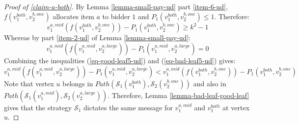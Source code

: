 \begin{proof}[Proof of \cref{claim-a-both}]
            By Lemma \ref{lemma-small-pay-ud} part \ref{item-6-ud}, $f(v_1^{both},v_2^{b,one})$ allocates item $a$ to bidder $1$ and $P_1(v_1^{both},\allowbreak v_2^{b,one})\le 1$. Therefore:
\begin{equation}\label{eq-good-leaf5-ud}
 v_1^{a,mid}(f(v_1^{both},v_2^{b,one}))-P_1(v_1^{both},v_2^{b,one})\ge k^2-1   
\end{equation}
Whereas by part \ref{item-2-ud} of Lemma \ref{lemma-small-pay-ud}: 
 \begin{equation}\label{eq-bad-leaf5-ud}
 v_1^{a,mid}(f(v_1^{a,mid},v_2^{a,large}))-P_1(v_1^{a,mid},v_2^{a,large})=0   
\end{equation}
Combining the inequalities (\ref{eq-good-leaf5-ud}) and (\ref{eq-bad-leaf5-ud}) gives:
\begin{equation*}
 v_1^{a,mid}(f(v_1^{a,mid},v_2^{a,large}))-P_1(v_1^{a,mid},v_2^{a,large})< 
 v_1^{a,mid}(f(v_1^{both},v_2^{b,one}))-P_1(v_1^{both},v_2^{b,one})
\end{equation*}
Note that vertex $u$ belongs in $Path(\mathcal S_1(v_1^{both}),\mathcal S_2(v_2^{b,one}))$ and also in
$Path(\mathcal{S}_1(v_1^{a,mid}),\allowbreak\mathcal{S}_2(v_2^{a,large}))$. Therefore, Lemma \ref{lemma-bad-leaf-good-leaf} gives that the strategy $\mathcal S_1$ dictates the same message for  $v_1^{a,mid}$ and $v_1^{both}$ at vertex $u$.
\end{proof}
